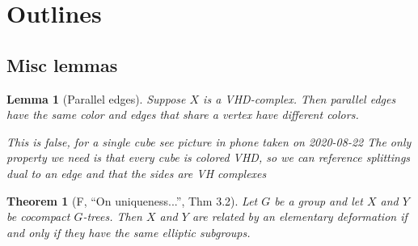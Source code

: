 \documentclass{article}
\theoremstyle{mystyle}
\newtheorem{thm}{Theorem}[section]
\newtheorem{lem}{Lemma}[section]
\newtheorem*{cor*}{Corollary}
\theoremstyle{remark}
\begin{document}
\section{Outlines}





\subsection{Misc lemmas}

\begin{lem}
    [Parallel edges]
    \label{lem:paralleledges} 
    Suppose \(X\) is a VHD-complex. Then parallel edges have the same color and edges that share a vertex have different colors.

    This is false, for a single cube see picture in phone taken on 2020-08-22
    The only property we need is that every cube is colored VHD, so we can reference splittings dual to an edge and that the sides are VH complexes
\end{lem}

\begin{thm}[F, ``On uniqueness...'', Thm 3.2]
\label{thm:forester}
Let $G$ be a group and let $X$ and $Y$ be cocompact $G$-trees. Then $X$ and $Y$ are related by an elementary deformation if and only if they have the same elliptic subgroups.
\end{thm}
\end{document}
